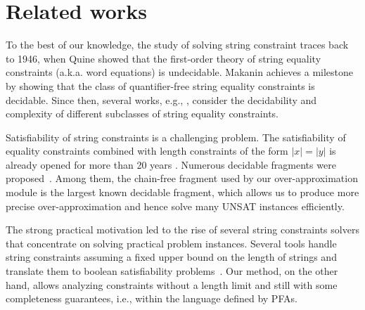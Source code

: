 \documentclass[sigplan,review,anonymous]{acmart}\settopmatter{printfolios=true,printccs=false,printacmref=false}
\begin{document}








\section{Related works} 
\label{section:related}
To the best of our knowledge, the study of solving string constraint traces back to 1946, when Quine \cite{quine1946concatenation} showed that the first-order theory of string equality constraints (a.k.a. word equations) is undecidable. Makanin achieves a milestone \cite{makanin1977problem} by showing that the class of quantifier-free string equality constraints is decidable.
Since then, several works, e.g., \cite{plandowski1999satisfiability,plandowski2006efficient,matiyasevich2008computation,robson1999quadratic,schulz1990makanin,ganesh2012word,ganesh2016undecidability}, consider the decidability and complexity of different subclasses of string equality constraints. 

Satisfiability of string constraints is a challenging problem. The satisfiability of equality constraints combined with length constraints of the form $|x|=|y|$ is already opened for more than 20 years \cite{buchi1990definability}.
Numerous decidable fragments were proposed~\cite{abdulla2014string,barcelo2013graph,lin2016string,chen2017decidable,chen2019decision,abdulla2019chain}. Among them, the chain-free fragment \cite{abdulla2019chain} used by our over-approximation module is the largest known decidable fragment, which allows us to produce more precise over-approximation and hence solve many UNSAT instances efficiently.

The strong practical motivation led to the rise of several string constraints solvers that concentrate on solving practical problem instances. Several tools handle string constraints assuming a fixed upper bound on the length of strings and translate them to boolean satisfiability problems~\cite{kiezun2009hampi,saxena2010symbolic,saxena2010flax}.  Our method, on the other hand, allows analyzing constraints without a length limit and still with some completeness guarantees, i.e., within the language defined by PFAs.
\end{document}
